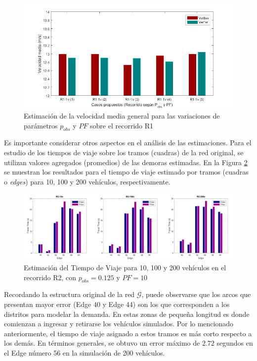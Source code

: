 \begin{figure}[!htp]
	\centering
	\includegraphics[width=0.7\linewidth]{images/speed-r1-1v.png}
	\captionsetup{width=0.7\linewidth}
	\caption{Estimación de la velocidad media general para las variaciones de parámetros $p_{obs}$ y $PF$ sobre el recorrido R1}
    \label{fig:speed-r1-1v}
\end{figure}

Es importante considerar otros aspectos en el análisis de las estimaciones. Para el estudio de los tiempos de viaje sobre los tramos (cuadras) de la red original, se utilizan valores agregados (promedios) de las demoras estimadas. En la Figura \ref{fig:edge-tt-r2} se muestran los resultados para el tiempo de viaje estimado por tramos (cuadras o \textit{edges}) para 10, 100 y 200 vehículos, respectivamente. 

\begin{figure}[!htp]
	\centering
	\includegraphics[width=\linewidth]{images/edge-tt-r2.png}
	\captionsetup{width=0.8\linewidth}
	\caption{Estimación del Tiempo de Viaje para 10, 100 y 200 vehículos en el recorrido R2, con $p_{obs}=0.125$ y $PF=10$}
    \label{fig:edge-tt-r2}
\end{figure}

Recordando la estructura original de la red $\mathcal{G}$, puede observarse que los arcos que presentan mayor error (Edge 40 y Edge 44) son los que corresponden a los distritos para modelar la demanda. En estas zonas de pequeña longitud es donde comienzan a ingresar y retirarse los vehículos simulados. Por lo mencionado anteriormente, el tiempo de viaje asignado a estos tramos es más corto respecto a los demás. En términos generales, se obtuvo un error máximo de 2.72 segundos en el Edge número 56 en la simulación de 200 vehículos.

